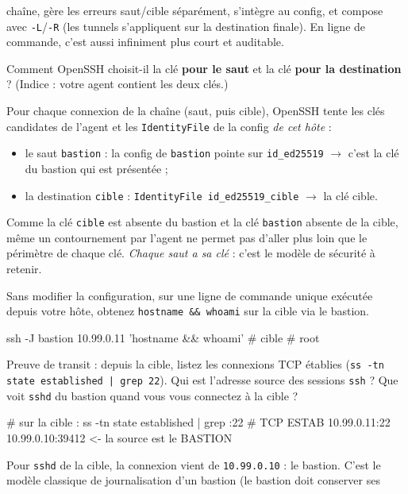 \documentclass[a4paper,10pt]{exam}
\begin{document}
\begin{questions}
\begin{solution}
chaîne, gère les erreurs saut/cible séparément, s'intègre au config, et compose avec
\texttt{-L}/\texttt{-R} (les tunnels s'appliquent sur la destination finale). En ligne de
commande, c'est aussi infiniment plus court et auditable.
\end{solution}
\question Comment OpenSSH choisit-il la clé \textbf{pour le saut} et la clé \textbf{pour
la destination} ? (Indice : votre agent contient les deux clés.)
\begin{solution}
Pour chaque connexion de la chaîne (saut, puis cible), OpenSSH tente les clés candidates
de l'agent et les \texttt{IdentityFile} de la config \emph{de cet hôte} :
\begin{itemize}
  \item le saut \texttt{bastion} : la config de \texttt{bastion} pointe sur
        \texttt{id\_ed25519} $\rightarrow$ c'est la clé du bastion qui est présentée ;
  \item la destination \texttt{cible} : \texttt{IdentityFile id\_ed25519\_cible} $\rightarrow$
        la clé cible.
\end{itemize}
Comme la clé \texttt{cible} est absente du bastion et la clé \texttt{bastion} absente de la
cible, même un contournement par l'agent ne permet pas d'aller plus loin que le périmètre
de chaque clé. \emph{Chaque saut a sa clé} : c'est le modèle de sécurité à retenir.
\end{solution}
\question Sans modifier la configuration, sur une ligne de commande unique exécutée
depuis votre hôte, obtenez \texttt{hostname \&\& whoami} sur la cible via le bastion.
\begin{solution}
\begin{bashcode}
ssh -J bastion 10.99.0.11 'hostname && whoami'
# cible
# root
\end{bashcode}
\end{solution}
\question Preuve de transit : depuis la cible, listez les connexions TCP établies
(\texttt{ss -tn state established | grep 22}). Qui est l'adresse source des sessions
\texttt{ssh} ? Que voit \texttt{sshd} du bastion quand vous vous connectez à la cible ?
\begin{solution}
\begin{bashcode}
# sur la cible :
ss -tn state established | grep :22
# TCP  ESTAB  10.99.0.11:22    10.99.0.10:39412     <- la source est le BASTION
\end{bashcode}
Pour \texttt{sshd} de la cible, la connexion vient de \texttt{10.99.0.10} : le bastion.
C'est le modèle classique de journalisation d'un bastion (le bastion doit conserver ses

\end{solution}
\end{questions}
\end{document}
